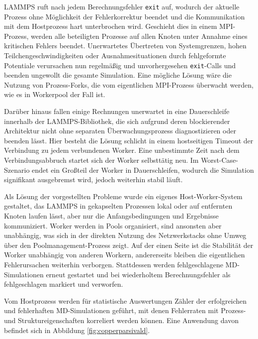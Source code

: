 LAMMPS ruft nach jedem Berechnungsfehler \texttt{exit} auf, wodurch der aktuelle Prozess ohne Möglichkeit der Fehlerkorrektur beendet und die Kommunikation mit dem Hostprozess hart unterbrochen wird.
Geschieht dies in einem MPI-Prozess, werden alle beteiligten Prozesse auf allen Knoten unter Annahme eines kritischen Fehlers beendet.
Unerwartetes Übertreten von Systemgrenzen, hohen Teilchengeschwindigkeiten oder Ausnahmesituationen durch fehlgeformte Potentiale verursachen nun regelmäßig und unvorhergesehen \texttt{exit}-Calls und beenden ungewollt die gesamte Simulation.
Eine mögliche Lösung wäre die Nutzung von Prozess-Forks, die vom eigentlichen MPI-Prozess überwacht werden, wie es in Workerpool der Fall ist.

Darüber hinaus fallen einige Rechnungen unerwartet in eine Dauerschleife innerhalb der LAMMPS-Bibliothek, die sich aufgrund deren blockierender Architektur nicht ohne separaten Überwachungsprozess diagnostizieren oder beenden lässt.
Hier besteht die Lösung schlicht in einem hostseitigen Timeout der Verbindung zu jedem verbundenen Worker.
Eine unbestimmte Zeit nach dem Verbindungsabbruch startet sich der Worker selbsttätig neu.
Im Worst-Case-Szenario endet ein Großteil der Worker in Dauerschleifen, wodurch die Simulation signifikant ausgebremst wird, jedoch weiterhin stabil läuft.

Als Lösung der vorgestellten Probleme wurde ein eigenes Host-Worker-System gestaltet, das LAMMPS in gekapselten Prozessen lokal oder auf entfernten Knoten laufen lässt, aber nur die Anfangsbedingungen und Ergebnisse kommuniziert.
Worker werden in Pools organisiert, sind ansonsten aber unabhängig, was sich in der direkten Nutzung des Netzwerkstacks ohne Umweg über den Poolmanagement-Prozess zeigt.
Auf der einen Seite ist die Stabilität der Worker unabhängig von anderen Workern, andererseits bleiben die eigentlichen Fehlerursachen weiterhin verborgen.
Stattdessen werden fehlgeschlagene MD-Simulationen erneut gestartet und bei wiederholtem Berechnungsfehler als fehlgeschlagen markiert und verworfen.

Vom Hostprozess werden für statistische Auswertungen Zähler der erfolgreichen und fehlerhaften MD-Simulationen geführt, mit denen Fehlerraten mit Prozess- und Struktureigenschaften korreliert werden können.
Eine Anwendung davon befindet sich in Abbildung \ref{fig:copperparsivald}.
